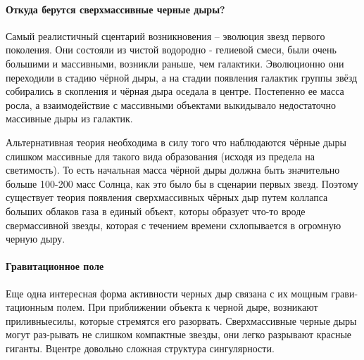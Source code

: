 \paragraph{Откуда берутся сверхмассивные черные дыры?}

Самый реалистичный сцентарий возникновения -- эволюция звезд первого поколения. Они состояли из чистой водородно - гелиевой смеси, были очень большими и массивными, возникли раньше, чем галактики. Эволюционно они переходили в стадию чёрной дыры, а на стадии появления галактик группы звёзд собирались в скопления и чёрная дыра оседала в центре. Постепенно ее масса росла, а взаимодействие с массивными объектами выкидывало недостаточно массивные дыры из галактик.

Альтернативная теория необходима в силу того что наблюдаются чёрные дыры слишком массивные для такого вида образования (исходя из предела на светимость). То есть начальная масса чёрной дыры должна быть значительно больше 100-200 масс Солнца, как это было бы в сценарии первых звезд. Поэтому существует теория появления сверхмассивных чёрных дыр путем коллапса больших облаков газа в единый объект, которы образует что-то вроде свермассивной звезды, которая с течением времени схлопывается в огромную черную дыру.

\paragraph{Гравитационное поле}

Еще одна интересная форма активности черных дыр связана с их мощным грави-тационным полем. При приближении объекта к черной дыре, возникают приливныесилы, которые стремятся его разорвать. Сверхмассивные черные дыры могут раз-рывать не слишком компактные звезды, они легко разрывают красные гиганты. Вцентре довольно сложная структура сингулярности.